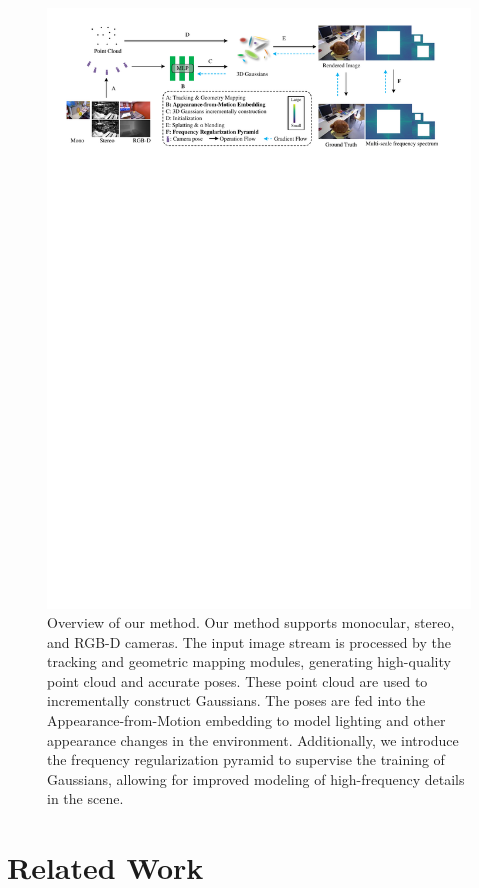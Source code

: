 \begin{figure}[t]
  \centering
   \includegraphics[width=1\linewidth]{fig/diagram.pdf}
   \caption{Overview of our method. Our method supports monocular, stereo, and RGB-D cameras. The input image stream is processed by the tracking and geometric mapping modules, generating high-quality point cloud and accurate poses. These point cloud are used to incrementally construct Gaussians. The poses are fed into the Appearance-from-Motion embedding to model lighting and other appearance changes in the environment. Additionally, we introduce the frequency regularization pyramid to supervise the training of Gaussians, allowing for improved modeling of high-frequency details in the scene.}
   \label{fig:diagram}
\end{figure}
\section{Related Work}
\label{sec:intro}

